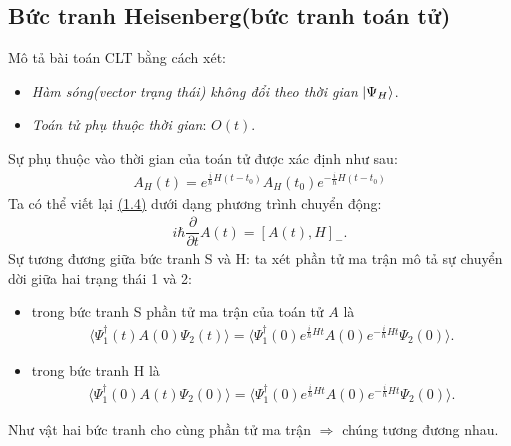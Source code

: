 \documentclass{report}
\begin{document}
\subsection{Bức tranh Heisenberg(bức tranh toán tử)}
Mô tả bài toán CLT bằng cách xét:
\begin{itemize}
	\item \textit{Hàm sóng(vector trạng thái) không đổi theo thời gian} $\ket{\Psi_{H}}$.
	\item \textit{Toán tử phụ thuộc thời gian}: $O(t)$.
\end{itemize}
Sự phụ thuộc vào thời gian của toán tử được xác định như sau:
\begin{align}\label{eq1.4}
	A_{H}(t) = e^{\frac{i}{\hbar}H(t-t_0)} A_{H}(t_0) e^{-\frac{i}{\hbar}H(t-t_0)}
\end{align}
Ta có thể viết lại \hyperref[eq1.4]{(1.4)} dưới dạng phương trình chuyển động:
\begin{align}
	i \hbar \dfrac{\partial}{\partial{t}} A(t) = \left[ A(t),H \right]_{-}.
\end{align}
Sự tương đương giữa bức tranh S và H: ta xét phần tử ma trận mô tả sự chuyển dời giữa hai trạng thái 1 và 2:
\begin{itemize}
	\item trong bức tranh S phần tử ma trận của toán tử $A$ là
	      \begin{align}\label{eq1.5}
		      \langle \Psi_{1}^{\dagger}(t) A(0) \Psi_{2}(t) \rangle = \langle \Psi_{1}^{\dagger}(0) e^{\frac{i}{\hbar}Ht} A(0) e^{-\frac{i}{\hbar}Ht} \Psi_{2}(0) \rangle.
	      \end{align}
	\item trong bức tranh H là
	      \begin{align}
		      \langle \Psi_{1}^{\dagger}(0) A(t) \Psi_{2}(0) \rangle = \langle \Psi_{1}^{\dagger}(0) e^{\frac{i}{\hbar}Ht} A(0) e^{-\frac{i}{\hbar}Ht} \Psi_{2}(0) \rangle.
	      \end{align}
\end{itemize}
Như vật hai bức tranh cho cùng phần tử ma trận $\Rightarrow$ chúng tương đương nhau.
\end{document}
